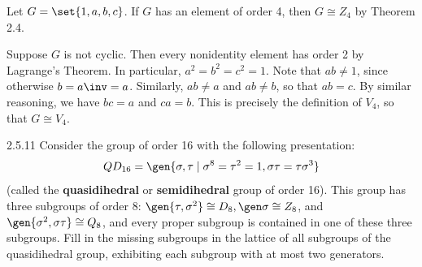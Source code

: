 \begin{sol}
    Let $G = \set{1, a, b, c}$.  If $G$ has an element of order 4, then $G \cong Z_4$ by Theorem 2.4.

    Suppose $G$ is not cyclic.
	Then every nonidentity element has order 2 by Lagrange's Theorem.
	In particular, $a^2 = b^2 = c^2 = 1$.
	Note that $ab \neq 1$, since otherwise $b = a\inv = a$.
	Similarly, $ab \neq a$ and $ab \neq b$, so that $ab = c$.
	By similar reasoning, we have $bc = a$ and $ca = b$.
	This is precisely the definition of $V_4$, so that $G \cong V_4$.
\end{sol}

\begin{exercise}{2.5.11} 
    Consider the group of order 16 with the following presentation:
    \[
    	QD_{16} = \gen{\sigma, \tau \mid \sigma^8 = \tau^2 = 1, \sigma\tau = \tau\sigma^3}
    \]
    (called the \textbf{quasidihedral} or \textbf{semidihedral} group of order 16).
	This group has three subgroups of order 8: $\gen{\tau, \sigma^2} \cong D_8, \gen \sigma \cong Z_8$, and $\gen{\sigma^2, \sigma\tau} \cong Q_8$, and every proper subgroup is contained in one of these three subgroups.
	Fill in the missing subgroups in the lattice of all subgroups of the quasidihedral group, exhibiting each subgroup with at most two generators.
    \begin{center}
    \end{center}
\end{exercise}

